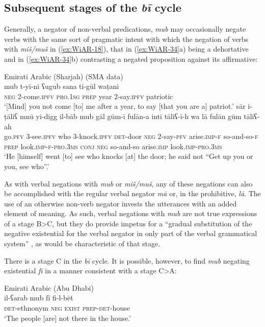 \documentclass[output=paper]{langsci/langscibook}
\begin{document}
\subsection{Subsequent stages of the \textit{bī} cycle} \label{s:WiAR-4.6}

Generally, a negator of non-verbal predications, \textit{mub} may occasionally negate verbs with the same sort of pragmatic intent with which the negation of verbs with \textit{miš/muš} in (\ref{ex:WiAR-18}), that in (\ref{ex:WiAR-34}a) being a dehortative and in (\ref{ex:WiAR-34}b) contrasting a negated proposition against its affirmative:

\ea Emirati Arabic (Sharjah) (SMA data)\label{ex:WiAR-34}\\
  \ea
	\gll mub t-yī-ni ʕugub sana ti-gūl waṭani\\
	\textsc{neg} 2-come.\textsc{ipfv} \textsc{pro.1sg} \textsc{prep} year 2-say.\textsc{ipfv} patriotic\\
  	\glt ‘[Mind] you not come [to] me after a year, to say [that you are a] patriot.’
  \ex
  	\gll sār i-ṭāliʕ mnū yi-digg il-bāb mub gāl gūm-ī fulān-a inti tāliʕ-ī-h wa lā fulān gūm tāliʕ-ah\\
  	go.\textsc{pfv} 3-see.\textsc{ipfv} who 3-knock.\textsc{ipfv} \textsc{det}-door \textsc{neg} 2-say-\textsc{pfv} arise.\textsc{imp-f} so-and-so-\textsc{f} \textsc{prep} look.\textsc{imp-f-pro.3ms} \textsc{conj} \textsc{neg} so-and-so arise.\textsc{imp} look.\textsc{imp-pro.3ms}\\
  	\glt ‘He [himself] went [to] see who knocks [at] the door; he said not “Get up you or you, see who”.’
\z \z


As with verbal negations with \textit{mub} or \textit{miš/muš}, any of these negations can also be accomplished with the regular verbal negator \textit{mā} or, in the prohibitive, \textit{lā}. The use of an otherwise non-verb negator invests the utterances with an added element of meaning. As such, verbal negations with \textit{mub} are not true expressions of a stage B>C, but they do provide impetus for a “gradual substitution of the negative existential for the verbal negator in only part of the verbal grammatical system” \citep[10]{Croft1991}, as would be characteristic of that stage.

There is a stage C in the \textit{bī} cycle. It is possible, however, to find \textit{mub} negating existential \textit{fī} in a manner consistent with a stage C>A:

\ea Emirati Arabic (Abu Dhabi)\label{ex:WiAR-35}\\
	\gll il-ʕarab mub fī fi-l-bēt\\
	\textsc{det}-ethnonym \textsc{neg} \textsc{exist} \textsc{prep-det}-house\\
	\glt ‘The people [are] not there in the house.’ \citep[121]{al-rawi1990a}
\z
\end{document}
